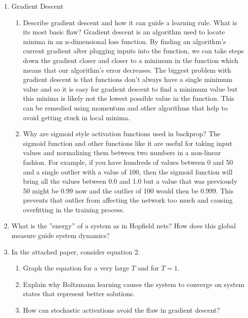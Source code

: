 \documentclass{report}
\theoremstyle{plain} %
\theoremstyle{definition} %
\theoremstyle{plain} %
\begin{document}
\begin{enumerate}
\item Gradient Descent
	\begin{enumerate}
	\item Describe gradient descent and how it can guide a learning rule. What is its most basic flaw?
		Gradient descent is an algorithm used to locate minima in an n-dimensional loss function. By finding an algorithm's current gradient after plugging inputs into the function, we can take steps down the gradient closer and closer to a minimum in the function which means that our algorithm's error decreases. The biggest problem with gradient descent is that functions don't always have a single minimum value and so it is easy for gradient descent to find a minimum value but this minima is likely not the lowest possible value in the function. This can be remedied using momentum and other algorithms that help to avoid getting stuck in local minima.
	\item Why are sigmoid style activation functions used in backprop?
		The sigmoid function and other functions like it are useful for taking input values and normalizing them between two numbers in a non-linear fashion. For example, if you have hundreds of values between 0 and 50 and a single outlier with a value of 100, then the sigmoid function will bring all the values between 0.0 and 1.0 but a value that was previously 50 might be 0.99 now and the outlier of 100 would then be 0.999. This prevents that outlier from affecting the network too much and causing overfitting in the training process.
	\end{enumerate}

\item What is the ''energy'' of a system as in Hopfield nets? How does this global measure guide system dynamics?
\item In the attached paper, consider equation 2.
	\begin{enumerate}
	\item Graph the equation for a very large $T$ and for $T=1$.
	\item Explain why Boltzmann learning causes the system to converge on system states that represent better solutions.
	\item How can stochastic activations avoid the flaw in gradient descent?
	\end{enumerate}
\end{enumerate}
\end{document}
